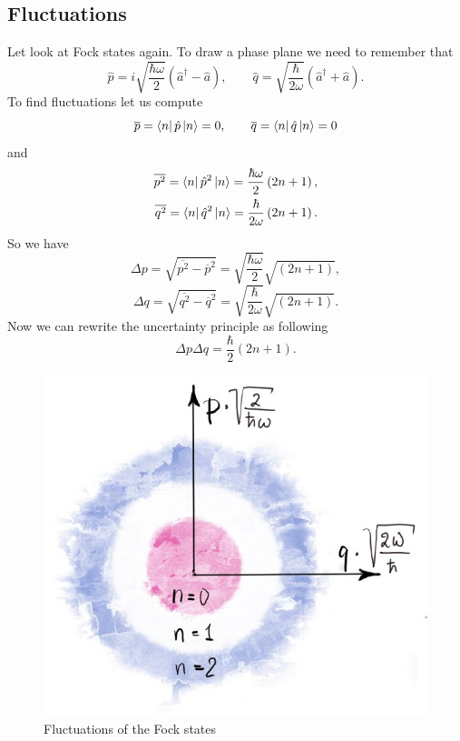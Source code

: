 \subsection{Fluctuations}

Let look at Fock states again. To draw a phase plane we need to remember that
\begin{equation}
	\hat{p} = i \sqrt{\frac{\hbar \omega}{2}} \left( \hat{a}^{\dagger} - \hat{a} \right), \qquad \hat{q} = \sqrt{\frac{\hbar}{2 \omega}}\left( \hat{a}^{\dagger} + \hat{a} \right).
\end{equation}
To find fluctuations let us compute
\begin{equation}
	\overline{p} = \left\langle {n} \right\rvert \hat{p} \left\lvert {n} \right\rangle = 0, \qquad \overline{q} = \left\langle {n} \right\rvert \hat{q} \left\lvert {n} \right\rangle = 0
\end{equation}
and
\begin{eqnarray}
	\overline{p^2} = \left\langle {n} \right\rvert \hat{p}^2 \left\lvert {n} \right\rangle = \frac{\hbar \omega}{2} \left( 2n+1 \right), \\
	\overline{q^2} = \left\langle {n} \right\rvert \hat{q}^2 \left\lvert {n} \right\rangle = \frac{\hbar}{2 \omega} \left( 2n+1 \right).
\end{eqnarray}
So we have
\begin{equation}
	\Delta p = \sqrt{\overline{p^2} - \overline{p}^2} = \sqrt{\frac{\hbar \omega}{2}} \sqrt{\left( 2n+1 \right)},
\end{equation}
\begin{equation}
	\Delta q = \sqrt{\overline{q^2} - \overline{q}^2} = \sqrt{\frac{\hbar }{2\omega}} \sqrt{\left( 2n+1 \right)}.
\end{equation}
Now we can rewrite the uncertainty principle as following
\begin{equation}
	\Delta p \Delta q = \frac{\hbar}{2} \left(2n+1\right).
\end{equation}

\begin{figure}
	\centering
	\includegraphics[width=0.4\linewidth]{fig/L2/fluc2}
	\caption{Fluctuations of the Fock states}
	\label{fig:fluc}
\end{figure}

